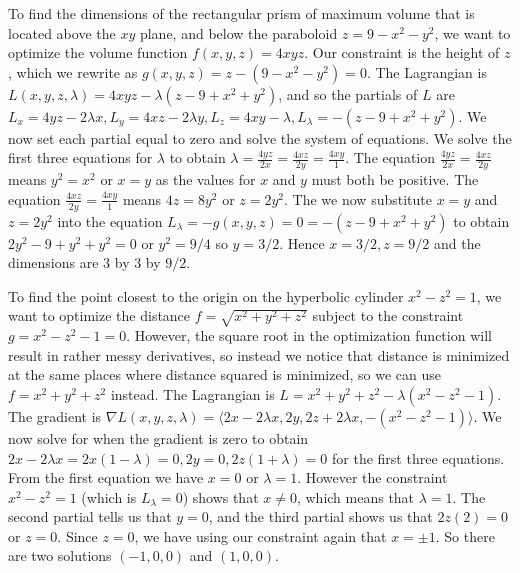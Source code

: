 \begin{example}
  To find the dimensions of the rectangular prism of maximum volume
  that is located above the {$xy$} plane, and below the paraboloid
  {$z=9-x^2-y^2$}, we want to optimize the volume function
  $f(x,y,z)=4xyz$.  Our constraint is the height of $z$, which we
  rewrite as $g(x,y,z)=z-(9-x^2-y^2)=0$.  The Lagrangian is
  $L(x,y,z,\lambda)=4xyz - \lambda(z-9+x^2+y^2)$, and so the partials
  of $L$ are $L_x = 4yz-2\lambda x, L_y=4xz-2\lambda y,
  L_z=4xy-\lambda, L_\lambda = -(z-9+x^2+y^2)$. We now set each
  partial equal to zero and solve the system of equations.  We solve
  the first three equations for $\lambda$ to obtain $\lambda =
  \frac{4yz}{2x} = \frac{4xz}{2y}= \frac{4xy}{1}$.  The equation
  $\frac{4yz}{2x} = \frac{4xz}{2y}$ means $y^2=x^2$ or $x=y$ as the
  values for $x$ and $y$ must both be positive.  The equation
  $\frac{4xz}{2y}= \frac{4xy}{1}$ means $4z=8y^2$ or $z=2y^2$.  The we
  now substitute $x=y$ and $z=2y^2$ into the equation
  $L_\lambda=-g(x,y,z)=0=-(z-9+x^2+y^2)$ to obtain $2y^2-9+y^2+y^2=0$
  or $y^2=9/4$ so $y=3/2$.  Hence $x=3/2,z=9/2$ and the dimensions are
  $3$ by $3$ by $9/2$.
\end{example}

\begin{example}
  To find the point closest to the origin on the hyperbolic cylinder
  {$x^2-z^2=1$}, we want to optimize the distance
  $f=\sqrt{x^2+y^2+z^2}$ subject to the constraint
  $g=x^2-z^2-1=0$. However, the square root in the optimization
  function will result in rather messy derivatives, so instead we
  notice that distance is minimized at the same places where distance
  squared is minimized, so we can use $f=x^2+y^2+z^2$ instead.  The
  Lagrangian is $L=x^2+y^2+z^2-\lambda(x^2-z^2-1)$. The gradient is
  $\nabla L(x,y,z,\lambda) = \langle2x-2\lambda x, 2y, 2z+2\lambda x,
  -(x^2-z^2-1)\rangle$. We now solve for when the gradient is zero to
  obtain $2x-2\lambda x = 2x(1-\lambda)=0, 2y=0, 2z(1+\lambda)=0$ for
  the first three equations.  From the first equation we have $x=0$ or
  $\lambda=1$. However the constraint $x^2-z^2=1$ (which is
  $L_\lambda=0$) shows that $x\neq 0$, which means that $\lambda=1$.
  The second partial tells us that $y=0$, and the third partial shows
  us that $2z(2)=0$ or $z=0$.  Since $z=0$, we have using our
  constraint again that $x=\pm 1$. So there are two solutions
  $(-1,0,0)$ and $(1,0,0)$.
\end{example}



